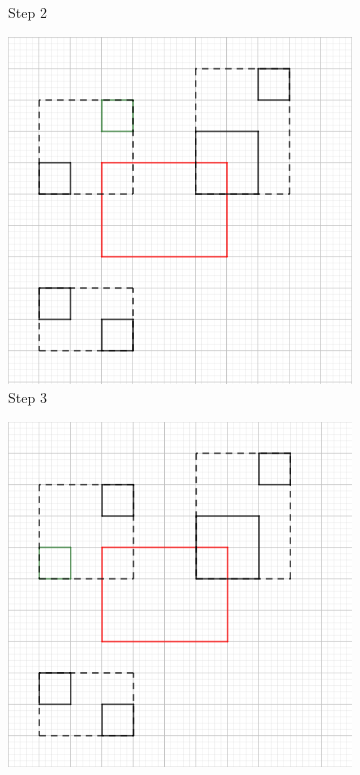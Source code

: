 \documentclass{article}
\begin{document}
\begin{figure}[h]
\begin{subfigure}{0.3\textwidth}
    \caption{Step 2}
    \centering
    \end{subfigure}
    \begin{subfigure}{0.3\textwidth}
    \includegraphics[width=\textwidth]{search/3.png}
    \caption{Step 3}
    \centering
    \end{subfigure}
    \begin{subfigure}{0.3\textwidth}
    \includegraphics[width=\textwidth]{search/4.png}

\end{subfigure}
\end{figure}
\end{document}
